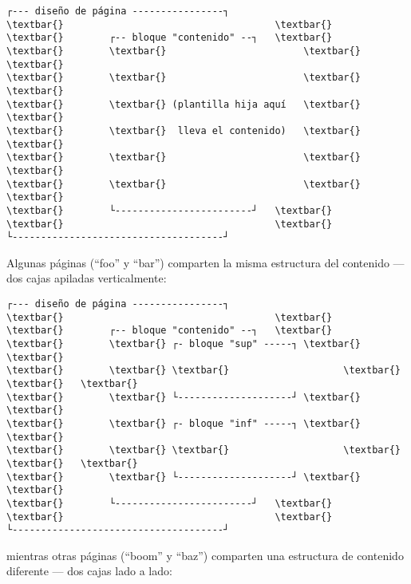 \documentclass[letterpaper,10pt,spanish]{sphinxmanual}
\begin{document}
\begin{Verbatim}[commandchars=\\\{\}]
┌--- diseño de página ----------------┐
\textbar{}                                     \textbar{}
\textbar{}        ┌-- bloque "contenido" --┐   \textbar{}
\textbar{}        \textbar{}                        \textbar{}   \textbar{}
\textbar{}        \textbar{}                        \textbar{}   \textbar{}
\textbar{}        \textbar{} (plantilla hija aquí   \textbar{}   \textbar{}
\textbar{}        \textbar{}  lleva el contenido)   \textbar{}   \textbar{}
\textbar{}        \textbar{}                        \textbar{}   \textbar{}
\textbar{}        \textbar{}                        \textbar{}   \textbar{}
\textbar{}        └------------------------┘   \textbar{}
\textbar{}                                     \textbar{}
└-------------------------------------┘
\end{Verbatim}

Algunas páginas (``foo'' y ``bar'') comparten la misma estructura del contenido ---
dos cajas apiladas verticalmente:

\begin{Verbatim}[commandchars=\\\{\}]
┌--- diseño de página ----------------┐
\textbar{}                                     \textbar{}
\textbar{}        ┌-- bloque "contenido" --┐   \textbar{}
\textbar{}        \textbar{} ┌- bloque "sup" -----┐ \textbar{}   \textbar{}
\textbar{}        \textbar{} \textbar{}                    \textbar{} \textbar{}   \textbar{}
\textbar{}        \textbar{} └--------------------┘ \textbar{}   \textbar{}
\textbar{}        \textbar{} ┌- bloque "inf" -----┐ \textbar{}   \textbar{}
\textbar{}        \textbar{} \textbar{}                    \textbar{} \textbar{}   \textbar{}
\textbar{}        \textbar{} └--------------------┘ \textbar{}   \textbar{}
\textbar{}        └------------------------┘   \textbar{}
\textbar{}                                     \textbar{}
└-------------------------------------┘
\end{Verbatim}

mientras otras páginas (``boom'' y ``baz'') comparten una estructura de contenido diferente --- dos cajas lado a lado:
\end{document}
